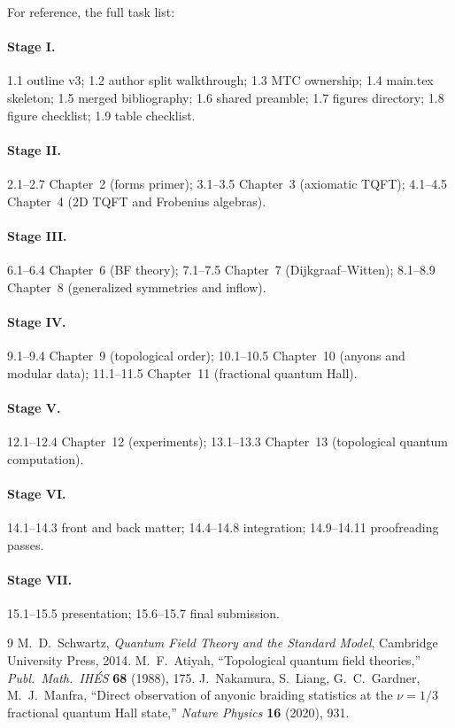 \documentclass[11pt]{article}
\begin{document}
For reference, the full task list:

\paragraph{Stage I.} 1.1 outline v3; 1.2 author split walkthrough; 1.3 MTC ownership;
1.4 main.tex skeleton; 1.5 merged bibliography; 1.6 shared preamble; 1.7 figures
directory; 1.8 figure checklist; 1.9 table checklist.

\paragraph{Stage II.} 2.1--2.7 Chapter~2 (forms primer);
3.1--3.5 Chapter~3 (axiomatic TQFT);
4.1--4.5 Chapter~4 (2D TQFT and Frobenius algebras).

\paragraph{Stage III.} 6.1--6.4 Chapter~6 (BF theory);
7.1--7.5 Chapter~7 (Dijkgraaf--Witten);
8.1--8.9 Chapter~8 (generalized symmetries and inflow).

\paragraph{Stage IV.} 9.1--9.4 Chapter~9 (topological order);
10.1--10.5 Chapter~10 (anyons and modular data);
11.1--11.5 Chapter~11 (fractional quantum Hall).

\paragraph{Stage V.} 12.1--12.4 Chapter~12 (experiments);
13.1--13.3 Chapter~13 (topological quantum computation).

\paragraph{Stage VI.} 14.1--14.3 front and back matter;
14.4--14.8 integration; 14.9--14.11 proofreading passes.

\paragraph{Stage VII.} 15.1--15.5 presentation; 15.6--15.7 final submission.

\begin{thebibliography}{9}
M.~D.~Schwartz, \emph{Quantum Field Theory and the Standard Model}, Cambridge University
Press, 2014.
M.~F.~Atiyah, ``Topological quantum field theories,'' \emph{Publ.\ Math.\ IH\'ES}
\textbf{68} (1988), 175.
J.~Nakamura, S.~Liang, G.~C.~Gardner, M.~J.~Manfra, ``Direct observation of anyonic
braiding statistics at the $\nu=1/3$ fractional quantum Hall state,'' \emph{Nature Physics}
\textbf{16} (2020), 931.
\end{thebibliography}
\end{document}
